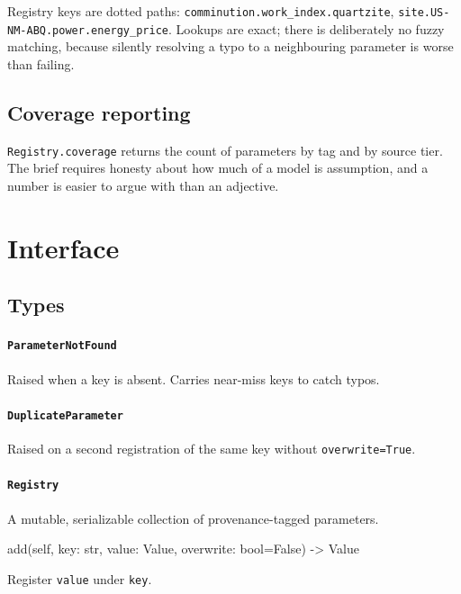 \documentclass[10pt,a4paper,twoside]{report}
\begin{document}
Registry keys are dotted paths: \texttt{comminution.work\_index.quartzite}, \texttt{site.US-NM-ABQ.power.energy\_price}. Lookups are exact; there is deliberately no fuzzy matching, because silently resolving a typo to a neighbouring parameter is worse than failing.

\subsection*{Coverage reporting}

\texttt{Registry.coverage} returns the count of parameters by tag and by source tier. The brief requires honesty about how much of a model is assumption, and a number is easier to argue with than an adjective.

\section{Interface}

\subsection*{Types}

\paragraph{\texttt{ParameterNotFound}}

Raised when a key is absent. Carries near-miss keys to catch typos.

\paragraph{\texttt{DuplicateParameter}}

Raised on a second registration of the same key without \texttt{overwrite=True}.

\paragraph{\texttt{Registry}}

A mutable, serializable collection of provenance-tagged parameters.

\begin{verbatimsmall}
add(self, key: str, value: Value, overwrite: bool=False) -> Value
\end{verbatimsmall}

Register \texttt{value} under \texttt{key}.
\end{document}
